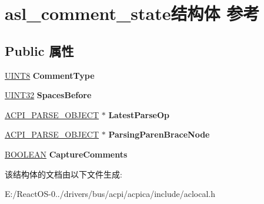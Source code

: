\hypertarget{structasl__comment__state}{}\section{asl\+\_\+comment\+\_\+state结构体 参考}
\label{structasl__comment__state}
\subsection*{Public 属性}
\begin{DoxyCompactItemize}
\item 
\mbox{\label{structasl__comment__state_a070aa17e8218989fb9809af04b7b28c9}} 
\hyperlink{_processor_bind_8h_ab27e9918b538ce9d8ca692479b375b6a}{U\+I\+N\+T8} {\bfseries Comment\+Type}
\item 
\mbox{\label{structasl__comment__state_a7e9d585c550c4c0abced4cd8e0b2c29b}} 
\hyperlink{_processor_bind_8h_ae1e6edbbc26d6fbc71a90190d0266018}{U\+I\+N\+T32} {\bfseries Spaces\+Before}
\item 
\mbox{\label{structasl__comment__state_a65efb85825298d86a891c72be9a872bb}} 
\hyperlink{unionacpi__parse__object}{A\+C\+P\+I\+\_\+\+P\+A\+R\+S\+E\+\_\+\+O\+B\+J\+E\+CT} $\ast$ {\bfseries Latest\+Parse\+Op}
\item 
\mbox{\label{structasl__comment__state_a9a6bffbd14efaa8bba4baa8d272c8ac5}} 
\hyperlink{unionacpi__parse__object}{A\+C\+P\+I\+\_\+\+P\+A\+R\+S\+E\+\_\+\+O\+B\+J\+E\+CT} $\ast$ {\bfseries Parsing\+Paren\+Brace\+Node}
\item 
\mbox{\label{structasl__comment__state_a97272e9067183e52a9d41cec7b49ceda}} 
\hyperlink{_processor_bind_8h_a112e3146cb38b6ee95e64d85842e380a}{B\+O\+O\+L\+E\+AN} {\bfseries Capture\+Comments}
\end{DoxyCompactItemize}


该结构体的文档由以下文件生成\+:\begin{DoxyCompactItemize}
\item 
E\+:/\+React\+O\+S-\/0../drivers/bus/acpi/acpica/include/aclocal.\+h\end{DoxyCompactItemize}

